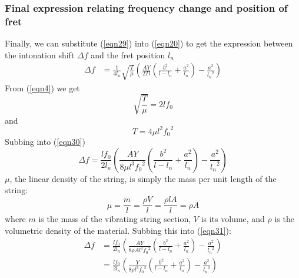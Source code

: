 \documentclass[11pt]{article}
\begin{document}
\begin{flushleft}
            \subsubsection*{Final expression relating frequency change and position of fret}
                Finally, we can substitute (\ref{eqn29}) into (\ref{eqn20}) to get the expression between the intonation shift $\Delta f$ and the fret position $l_n$
                \begin{align}
                    \Delta f &= \frac{1}{4l_n} \sqrt{\frac{T}{\mu}} \left( \frac{AY}{2Tl} \left( \frac{b^2}{l-l_n} + \frac{a^2}{l_n} \right) - \frac{a^2}{{l_n}^2} \right) \label{eqn30}
                \end{align}
                From (\ref{eqn4}) we get
                \begin{equation*}
                    \sqrt{\frac{T}{\mu}} = 2lf_0
                \end{equation*}
                and 
                \begin{equation*}
                    T = 4\mu l^2{f_0}^2    
                \end{equation*}
                Subbing into (\ref{eqn30})
                \begin{equation}
                    \Delta f = \frac{l f_0}{2l_n} \left( \frac{AY}{8\mu l^3 {f_0}^2} \left( \frac{b^2}{l-l_n} + \frac{a^2}{l_n} \right) - \frac{a^2}{{l_n}^2} \right) \label{eqn31}
                \end{equation}
                $\mu$, the linear density of the string, is simply the mass per unit length of the string:
                \begin{equation*}
                    \mu = \frac{m}{l} = \frac{\rho V}{l} = \frac{\rho l A}{l} = \rho A
                \end{equation*}
                where $m$ is the mass of the vibrating string section, $V$ is its volume, and $\rho$ is the volumetric density of the material. Subbing this into (\ref{eqn31}):
                \begin{align}
                    \Delta f &= \frac{l f_0}{2l_n} \left( \frac{AY}{8\rho A l^3 {f_0}^2} \left( \frac{b^2}{l-l_n} + \frac{a^2}{l_n} \right) - \frac{a^2}{{l_n}^2} \right) \label{eqn32} \\
                    &= \frac{l f_0}{2l_n} \left( \frac{Y}{8\rho l^3 {f_0}^2} \left( \frac{b^2}{l-l_n} + \frac{a^2}{l_n} \right) - \frac{a^2}{{l_n}^2} \right) \label{eqn33}
                \end{align}


\end{flushleft}
\end{document}
